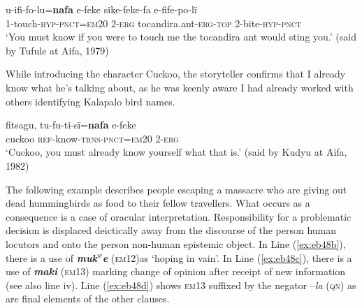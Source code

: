 \documentclass[output=paper]{langsci/langscibook}
\begin{document}
\begin{exe}
	\ex \label{ex:eb46}
	\gll u-ifi-fo-lu=\textbf{nafa} e-feke sike-feke-fa e-fife-po-lï\\
	1-touch-\textsc{hyp-pnct=em20} 2-\textsc{erg} tocandira.ant-\textsc{erg-top} 2-bite-\textsc{hyp-pnct}\\
	\trans ‘You must know if you were to touch me  the tocandira ant would sting you.’ (said by Tufule at Aifa, 1979)
\end{exe}
 
While introducing the character Cuckoo, the storyteller confirms that I already know what he’s talking about, as he was keenly aware I had already worked with others identifying Kalapalo bird names.

\begin{exe}
	\ex \label{ex:eb47}
	\gll fitsagu, tu-fu-ti-sï=\textbf{nafa} e-feke\\
	cuckoo \textsc{ref}-know-\textsc{trns-pnct=em20} 2-\textsc{erg}\\
	\trans ‘Cuckoo, you must already know yourself what that is.’ (said by Kudyu at Aifa, 1982)
\end{exe}

The following example describes people escaping a massacre who are giving out dead hummingbirds as food to their fellow travellers. What occurs as a consequence is a case of oracular interpretation. Responsibility for a problematic decision is displaced deictically away from the discourse of the  person human locutors and onto the  person non-human epistemic object.  In Line (\ref{ex:eb48b}), there is a use of \textbf{\textit{muk$^w$e}}  (\textsc{em}12)as ‘hoping in vain’. In Line (\ref{ex:eb48c}), there is a use of \textbf{\textit{maki}} (\textsc{em}13) marking change of opinion after receipt of new information (see also line iv). Line (\ref{ex:eb48d}) shows \textsc{em}13 suffixed by the negator –\textit{la} (\textsc{qn}) as are final elements of the other clauses.
\end{document}

